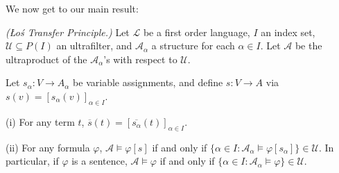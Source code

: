 \documentclass{article}
\def\A{\mathcal A}
\def\Lang{\mathcal L}
\def\U{\mathscr U}
\begin{document}
We now get to our main result:
\begin{theorem}\label{transferprinciple}
\emph{(\L o\'s Transfer Principle.)} Let $\Lang$ be a first order language, $I$ an index set, $\U\subseteq P(I)$ an ultrafilter, and $\A_\alpha$ a structure for each $\alpha\in I$.  Let $\A$ be the ultraproduct of the $\A_\alpha$'s with respect to $\U$.

Let $s_\alpha:V\to A_\alpha$ be variable assignments, and define $s:V\to A$ via $s(v)=[s_\alpha(v)]_{\alpha\in I}$.

(i) For any term $t$, $\overline s(t)=[\overline{s_\alpha}(t)]_{\alpha\in I}$.

(ii) For any formula $\varphi$, $\A\models\varphi[s]$ if and only if $\{\alpha\in I:\A_\alpha\models\varphi[s_\alpha]\}\in\U$.  In particular, if $\varphi$ is a sentence, $\A\models\varphi$ if and only if $\{\alpha\in I:\A_\alpha\models\varphi\}\in\U$.
\end{theorem}
\end{document}
